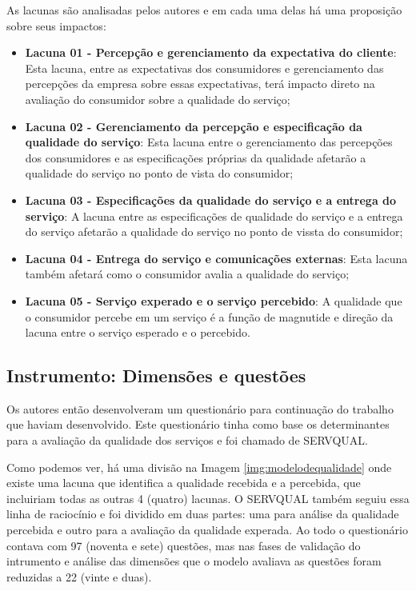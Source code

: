 As lacunas são analisadas pelos autores e em cada uma delas há uma proposição sobre seus impactos:
\begin{itemize}
	\item \textbf{Lacuna 01 - Percepção e gerenciamento da expectativa do cliente}: Esta lacuna, entre as expectativas dos consumidores e gerenciamento das percepções da empresa sobre essas expectativas, terá impacto direto na avaliação do consumidor sobre a qualidade do serviço;
	\item \textbf{Lacuna 02 - Gerenciamento da percepção e especificação da qualidade do serviço}: Esta lacuna entre o gerenciamento das percepções dos consumidores e as especificações próprias da qualidade afetarão a qualidade do serviço no ponto de vista do consumidor;
	\item \textbf{Lacuna 03 - Especificações da qualidade do serviço e a entrega do serviço}: A lacuna entre as especificações de qualidade do serviço e a entrega do serviço afetarão a qualidade do serviço no ponto de vissta do consumidor;
	\item \textbf{Lacuna 04 - Entrega do serviço e comunicações externas}: Esta lacuna também afetará como o consumidor avalia a qualidade do serviço;
	\item \textbf{Lacuna 05 - Serviço experado e o serviço percebido}: A qualidade que o consumidor percebe em um serviço é a função de magnutide e direção da lacuna entre o serviço esperado e o percebido.
\end{itemize}

\subsection{Instrumento: Dimensões e questões}
Os autores então desenvolveram um questionário para continuação do trabalho que haviam desenvolvido. Este questionário tinha como base os determinantes para a avaliação da qualidade dos serviços e foi chamado de SERVQUAL. 

Como podemos ver, há uma divisão na Imagem \ref{img:modelodequalidade} onde existe uma lacuna que identifica a qualidade recebida e a percebida, que incluiriam todas as outras 4 (quatro) lacunas. O SERVQUAL também seguiu essa linha de raciocínio e foi dividido em duas partes: uma para análise da qualidade percebida e outro para a avaliação da qualidade experada. Ao todo o questionário contava com 97 (noventa e sete) questões, mas nas fases de validação do intrumento e análise das dimensões que o modelo avaliava as questões foram reduzidas a 22 (vinte e duas).\cite{parasuraman1988}

